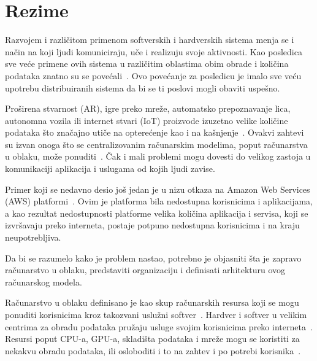 \chapter*{Rezime}
\pagestyle{plain}

Razvojem i razli\v citom primenom softverskih i hardverskih sistema menja se i na\v cin na koji ljudi komuniciraju, u\v ce i realizuju svoje aktivnosti. Kao posledica sve ve\'ce primene ovih sistema u razli\v citim oblastima obim obrade i koli\v cina podataka znatno su se pove\'cali~\cite{ChiangZ16}. Ovo pove\'canje za posledicu je imalo sve ve\'cu upotrebu distribuiranih sistema da bi se ti poslovi mogli obaviti uspe\v sno.

Pro\v sirena stvarnost (AR), igre preko mre\v ze, automatsko prepoznavanje lica, autonomna vozila ili internet stvari (IoT) proizvode izuzetno velike koli\v cine podataka \v sto zna\v cajno uti\v ce na opterećenje kao i na ka\v snjenje~\cite{ChiangZ16}. Ovakvi zahtevi su izvan onoga \v sto se centralizovanim ra\v cunarskim modelima, poput ra\v cunarstva u oblaku, mo\v ze ponuditi~\cite{ChiangZ16}. \v Cak i mali problemi mogu dovesti do velikog zastoja u komunikaciji aplikacija i uslugama od kojih ljudi zavise.  

Primer koji se nedavno desio jo\v s jedan je u nizu otkaza na Amazon Web Services (AWS) platformi~\cite{GunawiHSLSAE16}. Ovim je platforma bila nedostupna korisnicima i aplikacijama, a kao rezultat nedostupnosti platforme velika koli\v cina aplikacija i servisa, koji se izvr\v savaju preko interneta, postaje potpuno nedostupna korisnicima i na kraju neupotrebljiva. 


Da bi se razumelo kako je problem nastao, potrebno je objasniti \v sta je zapravo ra\v cunarstvo u oblaku, predstaviti organizaciju i definisati arhitekturu ovog ra\v cunarskog modela.

Ra\v cunarstvo u oblaku definisano je kao skup ra\v cunarskih resursa koji se mogu ponuditi korisnicima kroz takozvani uslu\v zni softver~\cite{Vogels}. Hardver i softver u velikim centrima za obradu podataka pru\v zaju usluge svojim korisnicima preko interneta~\cite {AboveTheCloud}. Resursi poput CPU-a, GPU-a, skladi\v sta podataka i mre\v ze mogu se koristiti za nekakvu obradu podataka, ili osloboditi i to na zahtev i po potrebi korisnika~\cite{ZhangCB10}. 


